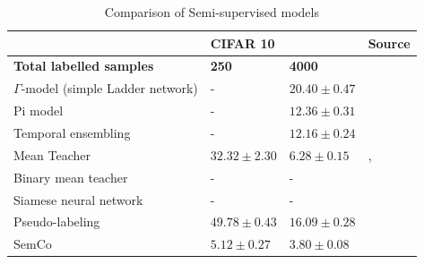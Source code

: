 \begin{table}[h!]
\centering
\begin{tabular}{|l|ll|l|}
\hline
                                & \multicolumn{2}{l|}{\textbf{CIFAR 10}}  & Source \\ \hline
\textbf{Total labelled samples} & \multicolumn{1}{l|}{\textbf{250}} & \textbf{4000} & \\ \hline
$\Gamma$-model (simple Ladder network) & \multicolumn{1}{l|}{-}&$20.40 \pm 0.47$&  \cite{Rasmus2015} \\ \hline
Pi model                        & \multicolumn{1}{l|}{-}& $12.36 \pm 0.31$& \cite{miyato2018virtual}\\ \hline
Temporal ensembling             & \multicolumn{1}{l|}{-}             & $12.16 \pm 0.24$  & \cite{miyato2018virtual}\\ \hline
Mean Teacher                    & \multicolumn{1}{l|}{$32.32 \pm 2.30$}&$6.28 \pm 0.15$ &\cite{nassar}, \cite{tarvainen} \\ \hline
Binary mean teacher             & \multicolumn{1}{l|}{-}& - &              \\ \hline
Siamese neural network          & \multicolumn{1}{l|}{-} & - &             \\ \hline
Pseudo-labeling                 & \multicolumn{1}{l|}{$49.78 \pm 0.43$}&$16.09 \pm 0.28$ & \cite{nassar} \\ \hline
SemCo & \multicolumn{1}{l|}{$5.12 \pm 0.27$}&$3.80 \pm 0.08$&\cite{nassar} \\ \hline
\end{tabular}
\caption{Comparison of Semi-supervised models}
\label{tab:comparison}
\end{table}